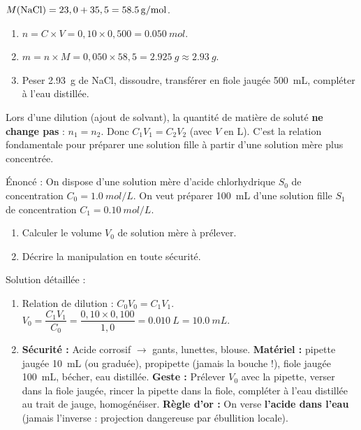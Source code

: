\documentclass[11pt]{article}
\begin{document}
\begin{exemplebox}
$M(\ce{NaCl}) = 23,0 + 35,5 = \SI{58,5}{g/mol}$.
\begin{enumerate}
\item $n = C \times V = 0,10 \times 0,500 = \SI{0,050}{mol}$.
\item $m = n \times M = 0,050 \times 58,5 = \SI{2,925}{g} \approx \SI{2,93}{g}$.
\item Peser \SI{2,93}{g} de NaCl, dissoudre, transférer en fiole jaugée \SI{500}{mL}, compléter à l'eau distillée.
\end{enumerate}
\end{exemplebox}

\begin{propriete}
Lors d'une dilution (ajout de solvant), la quantité de matière de soluté \textbf{ne change pas} : $n_1 = n_2$.
Donc $C_1 V_1 = C_2 V_2$ (avec $V$ en L).
C'est la relation fondamentale pour préparer une solution fille à partir d'une solution mère plus concentrée.
\end{propriete}

\begin{exoresolu}
Énoncé : On dispose d'une solution mère d'acide chlorhydrique $S_0$ de concentration $C_0 = \SI{1,0}{mol/L}$. On veut préparer \SI{100}{mL} d'une solution fille $S_1$ de concentration $C_1 = \SI{0,10}{mol/L}$.
\begin{enumerate}
\item Calculer le volume $V_0$ de solution mère à prélever.
\item Décrire la manipulation en toute sécurité.
\end{enumerate}
\tcblower
Solution détaillée :
\begin{enumerate}
\item Relation de dilution : $C_0 V_0 = C_1 V_1$.
$V_0 = \dfrac{C_1 V_1}{C_0} = \dfrac{0,10 \times 0,100}{1,0} = \SI{0,010}{L} = \SI{10,0}{mL}$.
\item \textbf{Sécurité :} Acide corrosif $\rightarrow$ gants, lunettes, blouse. \textbf{Matériel :} pipette jaugée \SI{10}{mL} (ou graduée), propipette (jamais la bouche !), fiole jaugée \SI{100}{mL}, bécher, eau distillée. \textbf{Geste :} Prélever $V_0$ avec la pipette, verser dans la fiole jaugée, rincer la pipette dans la fiole, compléter à l'eau distillée au trait de jauge, homogénéiser. \textbf{Règle d'or :} On verse \textbf{l'acide dans l'eau} (jamais l'inverse : projection dangereuse par ébullition locale).
\end{enumerate}
\end{exoresolu}
\end{document}
